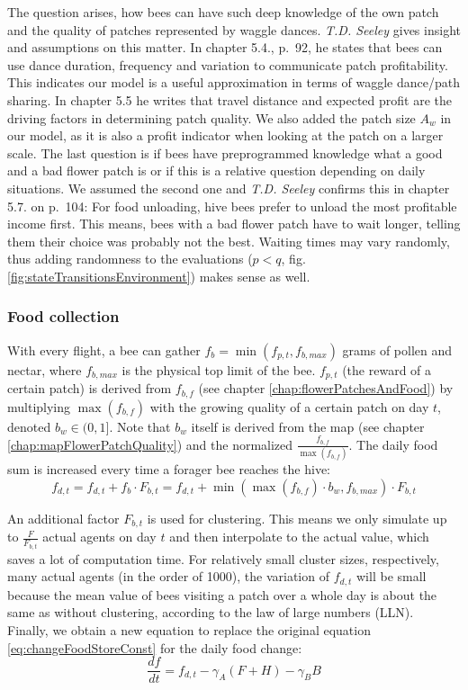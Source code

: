 			The question arises, how bees can have such deep knowledge of the own patch and the quality of patches represented by waggle dances. \textit{T.D. Seeley} \cite{seeley95} gives insight and assumptions on this matter. In chapter 5.4., p.~92, he states that bees can use dance duration, frequency and variation to communicate patch profitability. This indicates our model is a useful approximation in terms of waggle dance/path sharing. In chapter 5.5 he writes that travel distance and expected profit are the driving factors in determining patch quality. We also added the patch size $A_w$ in our model, as it is also a profit indicator when looking at the patch on a larger scale. The last question is if bees have preprogrammed knowledge what a good and a bad flower patch is or if this is a relative question depending on daily situations. We assumed the second one and \textit{T.D. Seeley} confirms this in chapter 5.7. on p.~104: For food unloading, hive bees prefer to unload the most profitable income first. This means, bees with a bad flower patch have to wait longer, telling them their choice was probably not the best. Waiting times may vary randomly, thus adding randomness to the evaluations ($p < q$, fig. \ref{fig:stateTransitionsEnvironment}) makes sense as well.
	
		\subsubsection{Food collection}
			\label{chap:foodCollection}
			With every flight, a bee can gather $f_b = \min(f_{p,t},f_{b,max})$ grams of pollen and nectar, where $f_{b,max}$ is the physical top limit of the bee. $f_{p,t}$ (the reward of a certain patch) is derived from $f_{b,f}$ (see chapter \ref{chap:flowerPatchesAndFood}) by multiplying $\max(f_{b,f})$ with the growing quality of a certain patch on day $t$, denoted $b_w \in (0,1]$. Note that $b_w$ itself is derived from the map (see chapter \ref{chap:mapFlowerPatchQuality}) and the normalized $\frac{f_{b,f}}{\max(f_{b,f})}$. The daily food sum is increased every time a forager bee reaches the hive:			
			\begin{equation}\label{eq:foodChangeDailyComputation}
				f_{d,t} = f_{d,t} + f_b \cdot F_{b,t} = f_{d,t} + \min(\max(f_{b,f}) \cdot b_w,f_{b,max}) \cdot F_{b,t}
			\end{equation}
			
			An additional factor $F_{b,t}$ is used for clustering. This means we only simulate up to $\frac{F}{F_{b,t}}$ actual agents on day $t$ and then interpolate to the actual value, which saves a lot of computation time. For relatively small cluster sizes, respectively, many actual agents (in the order of 1000), the variation of $f_{d,t}$ will be small because the mean value of bees visiting a patch over a whole day is about the same as without clustering, according to the law of large numbers (LLN).\\
			Finally, we obtain a new equation to replace the original equation \ref{eq:changeFoodStoreConst} for the daily food change:
			\begin{equation}\label{eq:changeFoodStoreDyn}
				\frac{df}{dt} = f_{d,t} - \gamma_A (F+H) - \gamma_B B
			\end{equation}
			
